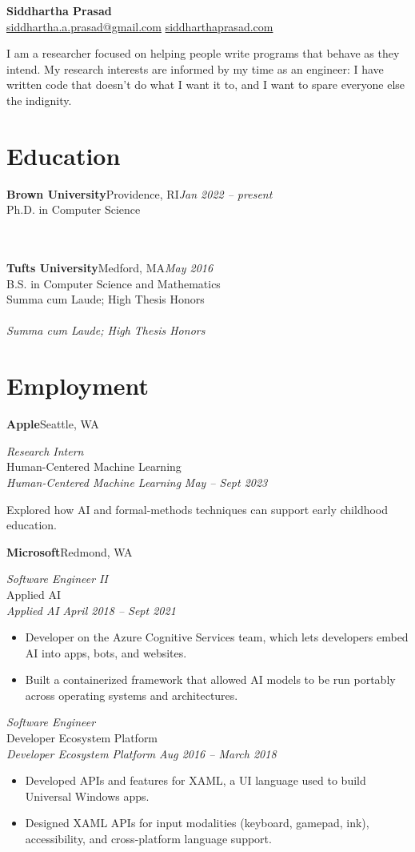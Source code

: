 \documentclass[10pt,letterpaper]{article}
\newcommand{\position}[2]{%
  \par\vspace{5pt}\noindent\textbf{#1}\hfill{\color{muted}#2}\par}
\newcommand{\role}[3]{%
  \par\vspace{1pt}\noindent
  \textit{#1}%
  \ifx\\#2\\\else{\color{muted}\,\textperiodcentered\,}\textit{#2}\fi
  \hfill\textit{#3}\par\vspace{1pt}}
\newcommand{\education}[5]{%
  \par\vspace{4pt}\noindent\textbf{#1}\hfill{\color{muted}#2}\hfill\textit{#4}\\%
  #3%
  \ifx\\#5\\\else\\{\color{muted}\textit{#5}}\fi\par}
\begin{document}
\begin{flushleft}
  {\LARGE\bfseries Siddhartha Prasad}\\[2pt]
  \href{mailto:siddhartha.a.prasad@gmail.com}{siddhartha.a.prasad@gmail.com}
  \quad\textbar\quad
  \href{https://siddharthaprasad.com}{siddharthaprasad.com}
\end{flushleft}

\noindent
I am a researcher focused on helping people write programs that behave as they
intend. My research interests are informed by my time as an engineer: I have
written code that doesn't do what I want it to, and I want to spare everyone
else the indignity.

\section*{Education}

\education{Brown University}{Providence, RI}%
  {Ph.D. in Computer Science}%
  {Jan 2022 -- present}%
  {}

\education{Tufts University}{Medford, MA}%
  {B.S. in Computer Science and Mathematics}%
  {May 2016}%
  {Summa cum Laude; High Thesis Honors}

\section*{Employment}

\position{Apple}{Seattle, WA}
\role{Research Intern}{Human-Centered Machine Learning}{May -- Sept 2023}
Explored how AI and formal-methods techniques can support early childhood
education.

\position{Microsoft}{Redmond, WA}
\role{Software Engineer II}{Applied AI}{April 2018 -- Sept 2021}
\begin{itemize}
  \item Developer on the Azure Cognitive Services team, which lets developers
        embed AI into apps, bots, and websites.
  \item Built a containerized framework that allowed AI models to be run
        portably across operating systems and architectures.
\end{itemize}

\role{Software Engineer}{Developer Ecosystem Platform}{Aug 2016 -- March 2018}
\begin{itemize}
  \item Developed APIs and features for XAML, a UI language used to build
        Universal Windows apps.
  \item Designed XAML APIs for input modalities (keyboard, gamepad, ink),
        accessibility, and cross-platform language support.
\end{itemize}
\end{document}
